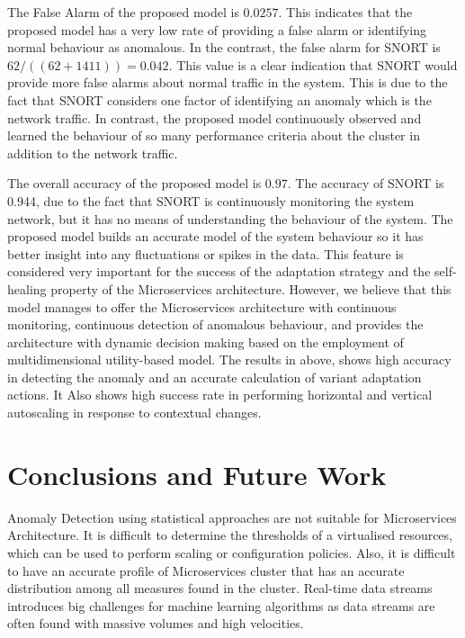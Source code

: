 \documentclass[sigconf]{acmart}
\begin{document}
The False Alarm of the proposed model  is $0.0257$. This indicates that the proposed model has a very low rate of providing a false alarm or identifying normal behaviour as anomalous. In the contrast, the false alarm for SNORT is $62/((62+1411))=0.042$. This value is a clear indication that SNORT would provide more false alarms about normal traffic in the system. This is due to the fact that SNORT considers one factor of identifying an anomaly which is the network traffic. In contrast, the proposed model continuously observed and learned the behaviour of so many performance criteria about the cluster in addition to the network traffic. 

The overall accuracy of the proposed model is $0.97$. The accuracy of SNORT is 0.944, due to the fact that SNORT is continuously monitoring the system network, but it has no means of understanding the behaviour of the system. The proposed model builds an accurate model of the system behaviour so it has better insight into any fluctuations or spikes in the data. This feature is considered very important for the success of the adaptation strategy and the self-healing property of the Microservices architecture. However, we believe that this model manages to offer the Microservices architecture with continuous monitoring, continuous detection of anomalous behaviour, and provides the architecture with dynamic decision making based on the employment of multidimensional utility-based model. The results in above, shows high accuracy in detecting the anomaly and an accurate calculation of variant adaptation actions. It Also shows high success rate in performing horizontal and vertical autoscaling in response to contextual changes. 

 


 \section{Conclusions and Future Work}\label{sec:Conclusion}
 Anomaly Detection using statistical approaches are not suitable for Microservices Architecture. It is difficult to determine the thresholds of a virtualised resources, which can be used to perform scaling or configuration policies. 
Also, it is difficult to have an accurate profile of Microservices cluster that has an accurate distribution among all measures found in the cluster. Real-time data streams introduces big challenges for machine learning algorithms as data streams are often found with massive volumes and high velocities. 
\end{document}
